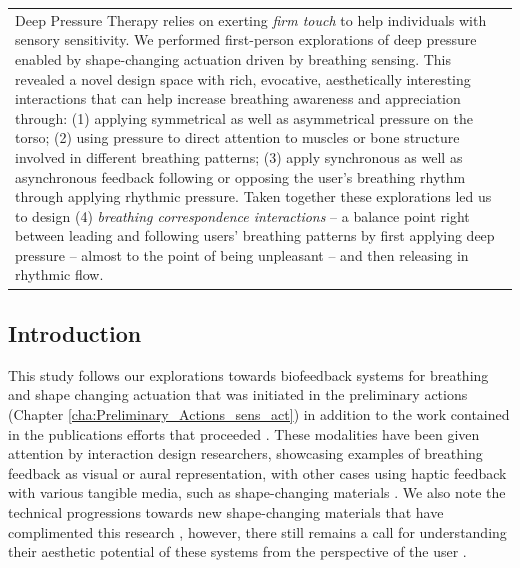 \begin{center}
\begin{tabular}{ p{13cm}}
Deep Pressure Therapy relies on exerting \textit{firm touch} to help individuals with sensory sensitivity. We performed first-person explorations of deep pressure enabled by shape-changing actuation driven by breathing sensing. This revealed a novel design space with rich, evocative, aesthetically interesting interactions that can help increase breathing awareness and appreciation through: (1) applying symmetrical as well as asymmetrical pressure on the torso; (2) using pressure to direct attention to muscles or bone structure involved in different breathing patterns; (3) apply synchronous as well as asynchronous feedback following or opposing the user's breathing rhythm through applying rhythmic pressure. Taken together these explorations led us to design (4) \textit{breathing correspondence interactions} -- a balance point right between leading and following users' breathing patterns by first applying deep pressure -- almost to the point of being unpleasant -- and then releasing in rhythmic flow.
\end{tabular}
\end{center}

\subsection{Introduction}

This study follows our explorations towards biofeedback systems for breathing and shape changing actuation that was initiated in the preliminary actions (Chapter \ref{cha:Preliminary_Actions_sens_act}) in addition to the work contained in the publications efforts that proceeded \cite{sanches_ambiguity_2019, alfaras_biodata_2020}. These modalities have been given attention by interaction design researchers, showcasing examples of breathing feedback as visual or aural representation, with other cases using haptic feedback with various tangible media, such as shape-changing materials \cite{prpa_inhaling_2020, miri_piv_2020}. We also note the technical progressions towards new shape-changing materials that have complimented this research \cite{coelho_shape-changing_2011}, however, there still remains a call for understanding their aesthetic potential of these systems from the perspective of the user \cite{rasmussen_shape-changing_2012,alexander_grand_2018}.

